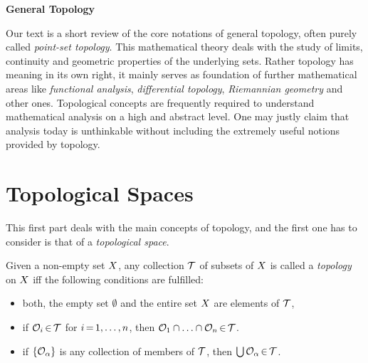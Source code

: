 \documentclass[11pt,twoside]{article}
\begin{document}
\thispagestyle{empty}

\def\Title{General Topology}

\centerline{\large{\textbf{\Title}}}
\vspace{4pt}
\centerline{\small{\textsc{\Author}}}
\vspace{10pt}



\fancyhead[OL]{\small{\thepage}}
\fancyhead[ER]{\small{\thepage}}

\setcounter{page}{1}

Our text is a short review of the core notations of general topology,
often purely called \textit{point-set topology}.
This mathematical theory deals with the study of limits,
continuity and geometric properties of the underlying sets.
Rather topology has meaning in its own right,
it mainly serves as foundation of further mathematical areas
like \textit{functional analysis}, \textit{differential topology},
\textit{Riemannian geometry} and other ones.
Topological concepts are frequently required to understand
mathematical analysis on a high and abstract level.
One may justly claim
that analysis today is unthinkable
without including the extremely useful notions provided by topology.

\part{Topological Spaces}                                                      %
This first part deals with the main concepts of topology,
and the first one has to consider is that of a \textit{topological space}.

\subparagraph{} %
Given a non-empty set $X$,
any collection $\mathcal{T}$ of subsets of $X$ is called
a \textit{topology} on $X$
iff the following conditions are fulfilled:

\begin{itemize}[leftmargin=10mm,itemsep=1pt]
\item[(T-1)]
both,
the empty set $\emptyset$ and the entire set $X$ are elements of $\mathcal{T}$,

\item[(T-2)]
if $\mathcal{O}_i {\,\in\,} \mathcal{T}$ for $i {\,=\,} 1,\ldots,n$,
then $\mathcal{O}_1 \cap \ldots \cap \mathcal{O}_n {\,\in\,} \mathcal{T}$.

\item[(T-3)]
if $\{\mathcal{O}_{\alpha}\}$ is any collection of members of $\mathcal{T}$,
then $\bigcup \mathcal{O}_{\alpha} {\,\in\,} \mathcal{T}$.
\end{itemize}
\end{document}
